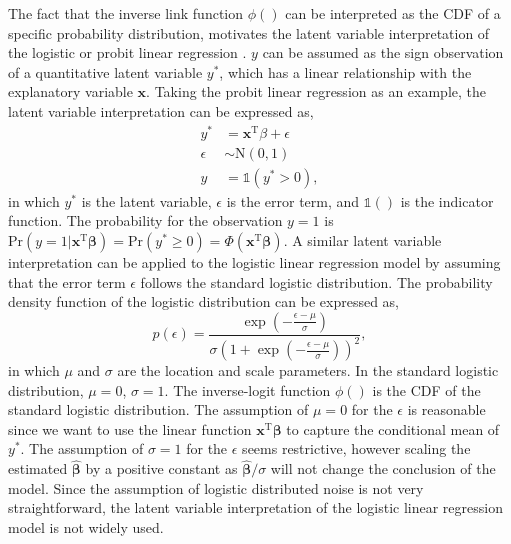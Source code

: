 The fact that the inverse link function $\phi()$ can be interpreted as the CDF of a specific probability distribution, motivates the latent variable interpretation of the logistic or probit linear regression \cite{agresti2013categorical}. $y$ can be assumed as the sign observation of a quantitative latent variable $y^{\ast}$, which has a linear relationship with the explanatory variable $\mathbf{x}$. Taking the probit linear regression as an example, the latent variable interpretation can be expressed as,
\begin{equation*}
\begin{split}
        y^{\ast} &= \mathbf{x}^{\text{T}}\beta + \epsilon\\
 \epsilon &\sim \text{N}(0,1) \\
        y &= \mathbb{1}{(y^{\ast}>0)},
\end{split}
\end{equation*}
in which $y^{\ast}$ is the latent variable, $\epsilon$ is the error term, and $\mathbb{1}()$ is the indicator function. The probability for the observation $y = 1$ is $\text{Pr}(y=1|\mathbf{x}^{\text{T}}\bm{\beta}) = \text{Pr}(y^{\ast} \geq 0)= \Phi(\mathbf{x}^{\text{T}}\bm{\beta})$. A similar latent variable interpretation can be applied to the logistic linear regression model by assuming that the error term $\epsilon$ follows the standard logistic distribution. The probability density function of the logistic distribution can be expressed as,
\begin{equation*}
  p(\epsilon) = \frac{\exp(- \frac{\epsilon-\mu}{\sigma})}{\sigma(1+\exp(-\frac{\epsilon-\mu}{\sigma}))^2},
\end{equation*}
in which $\mu$ and $\sigma$ are the location and scale parameters. In the standard logistic distribution, $\mu=0$, $\sigma=1$. The inverse-logit function $\phi()$ is the CDF of the standard logistic distribution. The assumption of $\mu=0$ for the $\epsilon$ is reasonable since we want to use the linear function $\mathbf{x}^{\text{T}}\bm{\beta}$ to capture the conditional mean of $y^{\ast}$. The assumption of $\sigma=1$ for the $\epsilon$ seems restrictive, however scaling the estimated $\hat{\bm{\beta}}$ by a positive constant as $\hat{\bm{\beta}}/\sigma$ will not change the conclusion of the model. Since the assumption of logistic distributed noise is not very straightforward, the latent variable interpretation of the logistic linear regression model is not widely used.

